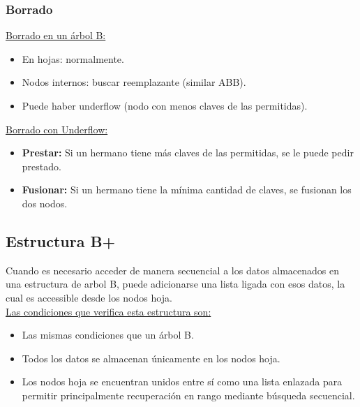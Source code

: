 \documentclass[../main.tex]{subfiles}
\begin{document}
        \subsubsection{Borrado}
            \underline{Borrado en un árbol B:}
            \begin{itemize}
                \item En hojas: normalmente.
                \item Nodos internos: buscar reemplazante (similar ABB).
                \item Puede haber underflow (nodo con menos claves de las permitidas).
            \end{itemize}

            \underline{Borrado con Underflow:}
            \begin{itemize}
                \item \textbf{Prestar:} Si un hermano tiene más claves de las permitidas, se le puede pedir prestado.
                \item \textbf{Fusionar:} Si un hermano tiene la mínima cantidad de claves, se fusionan los dos nodos.
            \end{itemize}

    \subsection{Estructura B+}
        Cuando es necesario acceder de manera secuencial a los datos almacenados en una estructura de arbol B, puede adicionarse una lista ligada con esos datos, la cual es accessible desde los nodos hoja.\\
        
        \underline{Las condiciones que verifica esta estructura son:}
        \begin{itemize}
            \item Las mismas condiciones que un árbol B.
            \item Todos los datos se almacenan únicamente en los nodos hoja.
            \item Los nodos hoja se encuentran unidos entre sí como una lista enlazada para permitir principalmente recuperación en rango mediante búsqueda secuencial.
        \end{itemize}
        



    
\end{document}
